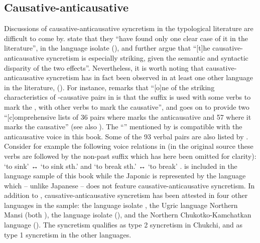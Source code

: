 \largerpage
\subsection{Causative-anticausative} \label{sec:simple-syncretism:caus-antc}
Discussions of causative-anticausative syncretism in the typological literature are difficult to come by. \citet[244]{zuniga:kittila:2019} state that they “have found only one clear case of it in the literature”, in the language isolate  (), and further argue that “[t]he causative-anticausative syncretism is especially striking, given the semantic and syntactic disparity of the two effects”. Nevertheless, it is worth noting that causative-anticausative syncretism has in fact been observed in at least one other language in the literature,  (). For instance, \citet[310]{comrie:2006} remarks that “[o]ne of the striking characteristics of -causative pairs in  is that the suffix  is used with some verbs to mark the , with other verbs to mark the causative”, and goes on to provide two “[c]omprehensive lists of 36 pairs where  marks the anticausative and 57 where it marks the causative” (see also \citealt[197ff.]{jacobsen:1982}). The “” mentioned by \citeauthor{comrie:2006} is compatible with the anticausative voice in this book. Some of the 93 verbal pairs are also listed by \citet[116]{haspelmath:1993}. Consider for example the following voice relations in  (in the original source these verbs are followed by the non-past suffix  which has here been omitted for clarity):  ‘to sink’ ↔  ‘to sink sth.’ and  ‘to break sth.’ ↔  ‘to break’ \citep[311f.]{comrie:2006}.  is included in the language sample of this book while the Japonic  is represented by the language  which -- unlike Japanese -- does not feature causative-anticausative syncretism. In addition to , causative-anticausative syncretism has been attested in four other languages in the sample: the language isolate , the Ugric language Northern Mansi (both ), the language isolate  (), and the Northern Chukotko-Kamchatkan language  (). The syncretism qualifies as type 2 syncretism in Chukchi, and as type 1 syncretism in the other languages.

